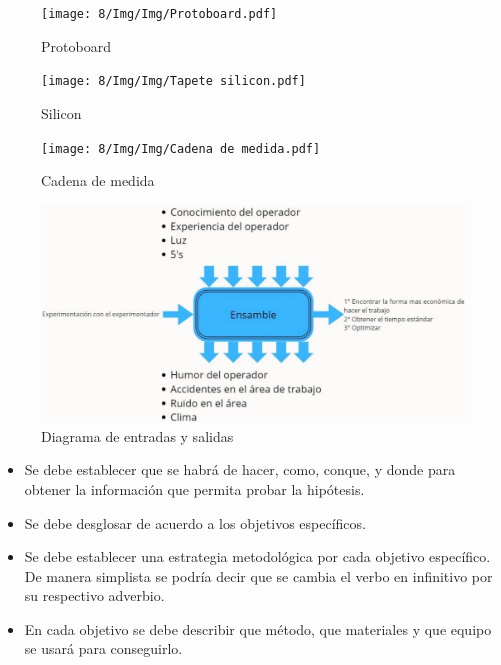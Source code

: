     \begin{figure}[H]
        \centering
        \texttt{[image: 8/Img/Img/Protoboard.pdf]}
        \caption{Protoboard}
        \label{Protoboard}
    \end{figure}
    
    \begin{figure}[H]
        \centering
        \texttt{[image: 8/Img/Img/Tapete silicon.pdf]}
        \caption{Silicon}
        \label{Siliconl}
    \end{figure}
    
    \begin{figure}[H]
        \centering
        \texttt{[image: 8/Img/Img/Cadena de medida.pdf]}
        \caption{Cadena de medida}
        \label{Cadena de medida}
    \end{figure}
    
    \begin{figure}[H]
        \centering
        \includegraphics[trim = {1mm 1mm 1mm 1mm},clip,scale=0.3]{8/Img/Diagrama de entradas y salidas.pdf}
        \caption{Diagrama de entradas y salidas}
        \label{Diagrama de entradas y salidas}
    \end{figure}
    
    
    \begin{itemize}
        \item Se debe establecer que se habrá de hacer, como, conque, y donde para obtener la información que permita probar la hipótesis.  
        \item Se debe desglosar de acuerdo a los objetivos específicos. 
        \item Se debe establecer una estrategia metodológica por cada objetivo específico. De manera simplista se podría decir que se cambia el verbo en infinitivo por su respectivo adverbio.
        \item En cada objetivo se debe describir que método, que materiales y que equipo se usará para conseguirlo.
    \end{itemize}
